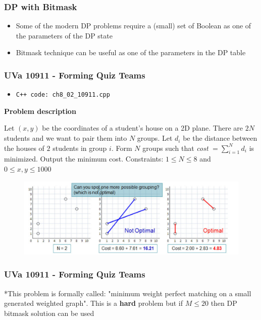 \documentclass{beamer}
\begin{document}
\begin{frame}[fragile]
\frametitle{DP with Bitmask}

\begin{itemize}
    \item Some of the modern DP problems require a (small) set of Boolean as one of the parameters of the DP state
    \item Bitmask technique can be useful as one of the parameters in the DP table
\end{itemize}

\end{frame}


\begin{frame}[fragile]
\frametitle{UVa 10911 - Forming Quiz Teams}

\begin{itemize}
    \item \color{blue}\verb|C++ code: ch8_02_10911.cpp|\color{black}
\end{itemize}

\color{red}\textbf{Problem description}\color{black}

Let $(x, y)$ be the coordinates of a student’s house on a 2D plane. There are $2N$ students and we want to pair them into $N$ groups. Let $d_i$ be the distance between the houses of $2$ students in group $i$. Form $N$ groups such that \textit{cost} $ = \sum_{i=1}^{N}d_i$ is minimized. Output the minimum cost. Constraints: $1 \leq N \leq 8$ and $0 \leq x, y \leq 1000$

\begin{figure}
    \centering
    \includegraphics[scale=0.4]{imgs/uva_10911.png}
\end{figure}

\end{frame}

\begin{frame}[fragile]
\frametitle{UVa 10911 - Forming Quiz Teams}
\color{blue}*This problem is formally called: "minimum weight perfect matching on a small generated weighted graph". This is a \textbf{hard} problem but if $M \leq 20$ then DP bitmask solution can be used\color{black}
\end{frame}
\end{document}

